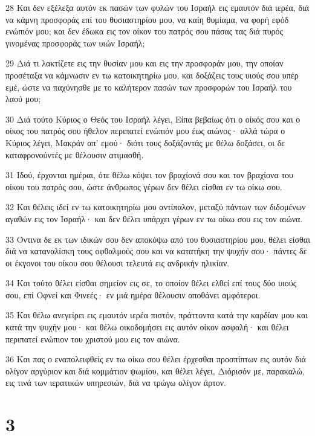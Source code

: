 \par 28 Και δεν εξέλεξα αυτόν εκ πασών των φυλών του Ισραήλ εις εμαυτόν διά ιερέα, διά να κάμνη προσφοράς επί του θυσιαστηρίου μου, να καίη θυμίαμα, να φορή εφόδ ενώπιόν μου; και δεν έδωκα εις τον οίκον του πατρός σου πάσας τας διά πυρός γινομένας προσφοράς των υιών Ισραήλ;
\par 29 Διά τι λακτίζετε εις την θυσίαν μου και εις την προσφοράν μου, την οποίαν προσέταξα να κάμνωσιν εν τω κατοικητηρίω μου, και δοξάζεις τους υιούς σου υπέρ εμέ, ώστε να παχύνησθε με το καλήτερον πασών των προσφορών του Ισραήλ του λαού μου;
\par 30 Διά τούτο Κύριος ο Θεός του Ισραήλ λέγει, Είπα βεβαίως ότι ο οίκός σου και ο οίκος του πατρός σου ήθελον περιπατεί ενώπιόν μου έως αιώνος· αλλά τώρα ο Κύριος λέγει, Μακράν απ' εμού· διότι τους δοξάζοντάς με θέλω δοξάσει, οι δε καταφρονούντές με θέλουσιν ατιμασθή.
\par 31 Ιδού, έρχονται ημέραι, ότε θέλω κόψει τον βραχίονά σου και τον βραχίονα του οίκου του πατρός σου, ώστε άνθρωπος γέρων δεν θέλει είσθαι εν τω οίκω σου.
\par 32 Και θέλεις ιδεί εν τω κατοικητηρίω μου αντίπαλον, μεταξύ πάντων των διδομένων αγαθών εις τον Ισραήλ· και δεν θέλει υπάρχει γέρων εν τω οίκω σου εις τον αιώνα.
\par 33 Όντινα δε εκ των ιδικών σου δεν αποκόψω από του θυσιαστηρίου μου, θέλει είσθαι διά να καταναλίσκη τους οφθαλμούς σου και να κατατήκη την ψυχήν σου· πάντες δε οι έκγονοι του οίκου σου θέλουσι τελευτά εις ανδρικήν ηλικίαν.
\par 34 Και τούτο θέλει είσθαι σημείον εις σε, το οποίον θέλει ελθεί επί τους δύο υιούς σου, επί Οφνεί και Φινεές· εν μιά ημέρα θέλουσιν αποθάνει αμφότεροι.
\par 35 Και θέλω ανεγείρει εις εμαυτόν ιερέα πιστόν, πράττοντα κατά την καρδίαν μου και κατά την ψυχήν μου· και θέλω οικοδομήσει εις αυτόν οίκον ασφαλή· και θέλει περιπατεί ενώπιον του χριστού μου εις τον αιώνα.
\par 36 Και πας ο εναπολειφθείς εν τω οίκω σου θέλει έρχεσθαι προσπίπτων εις αυτόν διά ολίγον αργύριον και διά κομμάτιον ψωμίου, και θέλει λέγει, Διόρισόν με, παρακαλώ, εις τινά των ιερατικών υπηρεσιών, διά να τρώγω ολίγον άρτον.

\chapter{3}

